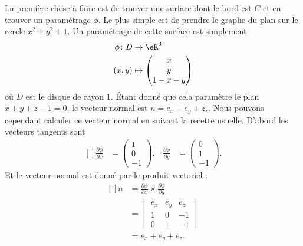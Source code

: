\begin{example}
	La première chose à faire est de trouver une surface dont le bord est \( C\) et en trouver un paramétrage \( \phi\). Le plus simple est de prendre le graphe du plan sur le cercle \( x^2+y^2+1\). Un paramétrage de cette surface est simplement
	\begin{equation}
		\begin{aligned}
			\phi\colon D & \to \eR^3              \\
			(x,y)        & \mapsto \begin{pmatrix}
				                       x \\
				                       y \\
				                       1-x-y
			                       \end{pmatrix}
		\end{aligned}
	\end{equation}
	où \( D\) est le disque de rayon \( 1\). Étant donné que cela paramètre le plan \( x+y+z-1=0\), le vecteur normal est \( n=e_x+e_y+z_z\). Nous pouvons cependant calculer ce vecteur normal en suivant la recette usuelle. D'abord les vecteurs tangents sont
	\begin{equation}
		\begin{aligned}[]
			\frac{ \partial \phi }{ \partial x } & =\begin{pmatrix}
				                                        1 \\
				                                        0 \\
				                                        -1
			                                        \end{pmatrix},
			                                     & \frac{ \partial \phi }{ \partial y } & =\begin{pmatrix}
				                                                                               0 \\
				                                                                               1 \\
				                                                                               -1
			                                                                               \end{pmatrix}.
		\end{aligned}
	\end{equation}
	Et le vecteur normal est donné par le produit vectoriel :
	\begin{equation}
		\begin{aligned}[]
			n & =\frac{ \partial \phi }{ \partial x }\times\frac{ \partial \phi }{ \partial y } \\
			  & =\begin{vmatrix}
				     e_x & e_y & e_z \\
				     1   & 0   & -1  \\
				     0   & 1   & -1
			     \end{vmatrix}                                                                \\
			  & =e_x+e_y+e_z.
		\end{aligned}
	\end{equation}


\end{example}
